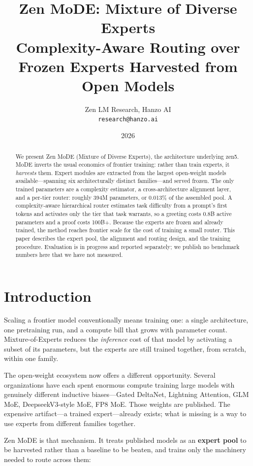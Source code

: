 \documentclass[11pt,a4paper]{article}
\title{\textbf{Zen MoDE: Mixture of Diverse Experts}\\
\large Complexity-Aware Routing over Frozen Experts Harvested from Open Models}
\author{Zen LM Research, Hanzo AI\\
\texttt{research@hanzo.ai}}
\date{2026}
\begin{document}
\maketitle

\begin{abstract}
We present Zen MoDE (Mixture of Diverse Experts), the architecture underlying zen5.
MoDE inverts the usual economics of frontier training: rather than train experts, it
\emph{harvests} them. Expert modules are extracted from the largest open-weight models
available---spanning six architecturally distinct families---and served frozen. The only
trained parameters are a complexity estimator, a cross-architecture alignment layer, and
a per-tier router: roughly 394M parameters, or 0.013\% of the assembled pool. A
complexity-aware hierarchical router estimates task difficulty from a prompt's first
tokens and activates only the tier that task warrants, so a greeting costs 0.8B active
parameters and a proof costs 100B+. Because the experts are frozen and already trained,
the method reaches frontier scale for the cost of training a small router. This paper
describes the expert pool, the alignment and routing design, and the training procedure.
Evaluation is in progress and reported separately; we publish no benchmark numbers here
that we have not measured.
\end{abstract}

\section{Introduction}

Scaling a frontier model conventionally means training one: a single architecture, one
pretraining run, and a compute bill that grows with parameter count. Mixture-of-Experts
reduces the \emph{inference} cost of that model by activating a subset of its
parameters, but the experts are still trained together, from scratch, within one family.

The open-weight ecosystem now offers a different opportunity. Several organizations have
each spent enormous compute training large models with genuinely different inductive
biases---Gated DeltaNet, Lightning Attention, GLM MoE, DeepseekV3-style MoE, FP8 MoE.
Those weights are published. The expensive artifact---a trained expert---already exists;
what is missing is a way to use experts from different families together.

Zen MoDE is that mechanism. It treats published models as an \textbf{expert pool} to be
harvested rather than a baseline to be beaten, and trains only the machinery needed to
route across them:
\end{document}

